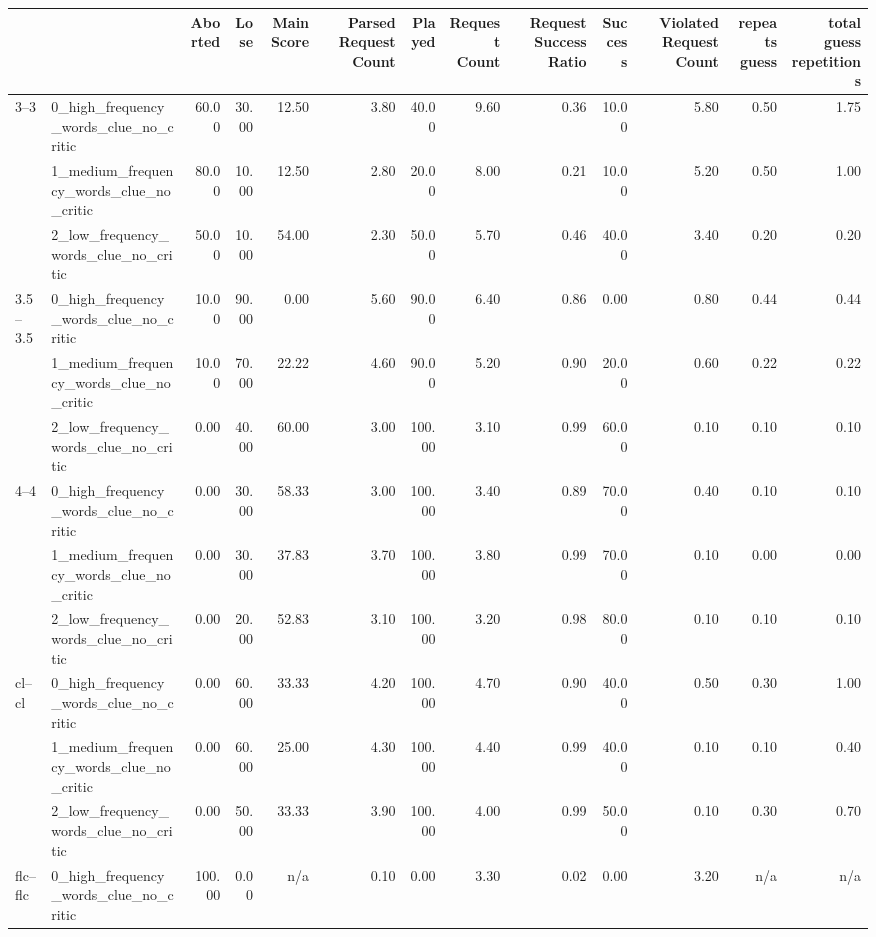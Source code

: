 \begin{tabular}{llrrrrrrrrrrr}
\toprule
 &  & Aborted & Lose & Main Score & Parsed Request Count & Played & Request Count & Request Success Ratio & Success & Violated Request Count & repeats guess & total guess repetitions \\
\midrule
\multirow[t]{3}{*}{3--3} & 0_high_frequency_words_clue_no_critic & 60.00 & 30.00 & 12.50 & 3.80 & 40.00 & 9.60 & 0.36 & 10.00 & 5.80 & 0.50 & 1.75 \\
 & 1_medium_frequency_words_clue_no_critic & 80.00 & 10.00 & 12.50 & 2.80 & 20.00 & 8.00 & 0.21 & 10.00 & 5.20 & 0.50 & 1.00 \\
 & 2_low_frequency_words_clue_no_critic & 50.00 & 10.00 & 54.00 & 2.30 & 50.00 & 5.70 & 0.46 & 40.00 & 3.40 & 0.20 & 0.20 \\
\cline{1-13}
\multirow[t]{3}{*}{3.5--3.5} & 0_high_frequency_words_clue_no_critic & 10.00 & 90.00 & 0.00 & 5.60 & 90.00 & 6.40 & 0.86 & 0.00 & 0.80 & 0.44 & 0.44 \\
 & 1_medium_frequency_words_clue_no_critic & 10.00 & 70.00 & 22.22 & 4.60 & 90.00 & 5.20 & 0.90 & 20.00 & 0.60 & 0.22 & 0.22 \\
 & 2_low_frequency_words_clue_no_critic & 0.00 & 40.00 & 60.00 & 3.00 & 100.00 & 3.10 & 0.99 & 60.00 & 0.10 & 0.10 & 0.10 \\
\cline{1-13}
\multirow[t]{3}{*}{4--4} & 0_high_frequency_words_clue_no_critic & 0.00 & 30.00 & 58.33 & 3.00 & 100.00 & 3.40 & 0.89 & 70.00 & 0.40 & 0.10 & 0.10 \\
 & 1_medium_frequency_words_clue_no_critic & 0.00 & 30.00 & 37.83 & 3.70 & 100.00 & 3.80 & 0.99 & 70.00 & 0.10 & 0.00 & 0.00 \\
 & 2_low_frequency_words_clue_no_critic & 0.00 & 20.00 & 52.83 & 3.10 & 100.00 & 3.20 & 0.98 & 80.00 & 0.10 & 0.10 & 0.10 \\
\cline{1-13}
\multirow[t]{3}{*}{cl--cl} & 0_high_frequency_words_clue_no_critic & 0.00 & 60.00 & 33.33 & 4.20 & 100.00 & 4.70 & 0.90 & 40.00 & 0.50 & 0.30 & 1.00 \\
 & 1_medium_frequency_words_clue_no_critic & 0.00 & 60.00 & 25.00 & 4.30 & 100.00 & 4.40 & 0.99 & 40.00 & 0.10 & 0.10 & 0.40 \\
 & 2_low_frequency_words_clue_no_critic & 0.00 & 50.00 & 33.33 & 3.90 & 100.00 & 4.00 & 0.99 & 50.00 & 0.10 & 0.30 & 0.70 \\
\cline{1-13}
\multirow[t]{3}{*}{flc--flc} & 0_high_frequency_words_clue_no_critic & 100.00 & 0.00 & n/a & 0.10 & 0.00 & 3.30 & 0.02 & 0.00 & 3.20 & n/a & n/a \\

\end{tabular}
